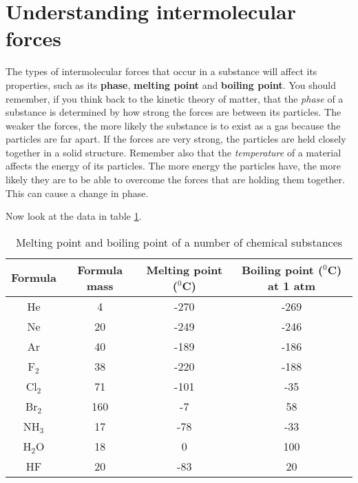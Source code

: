 \section{Understanding intermolecular forces}
\label{sec:intermolecular:understanding}

The types of intermolecular forces that occur in a substance will affect its properties, such as its \textbf{phase}, \textbf{melting point} and \textbf{boiling point}. You should remember, if you think back to the kinetic theory of matter, that the \textit{phase} of a substance is determined by how strong the forces are between its particles. The weaker the forces, the more likely the substance is to exist as a gas because the particles are far apart. If the forces are very strong, the particles are held closely together in a solid structure. Remember also that the \textit{temperature} of a material affects the energy of its particles. The more energy the particles have, the more likely they are to be able to overcome the forces that are holding them together. This can cause a change in phase.



Now look at the data in table \ref{tab:intermolecular:mpbp}.

\begin{table}[h]
\begin{center}
\begin{tabular}{|c|c|c|c|}\hline
\textbf{Formula} & \textbf{Formula mass} & \textbf{Melting point} ($^{0}$C) & \textbf{Boiling point} ($^{0}$C) at 1 atm \\\hline
He & 4 & -270 & -269 \\\hline
Ne & 20 & -249 & -246 \\\hline
Ar & 40 & -189 & -186 \\\hline
F$_{2}$ & 38 & -220 & -188 \\\hline
Cl$_{2}$ & 71 & -101 & -35 \\\hline
Br$_{2}$ & 160 & -7 & 58 \\\hline
NH$_{3}$ & 17 & -78 & -33 \\\hline
H$_{2}$O & 18 & 0 & 100 \\\hline
HF & 20 & -83 & 20 \\\hline
\end{tabular}
\caption{Melting point and boiling point of a number of chemical substances}
\label{tab:intermolecular:mpbp}
\end{center}
\end{table}

